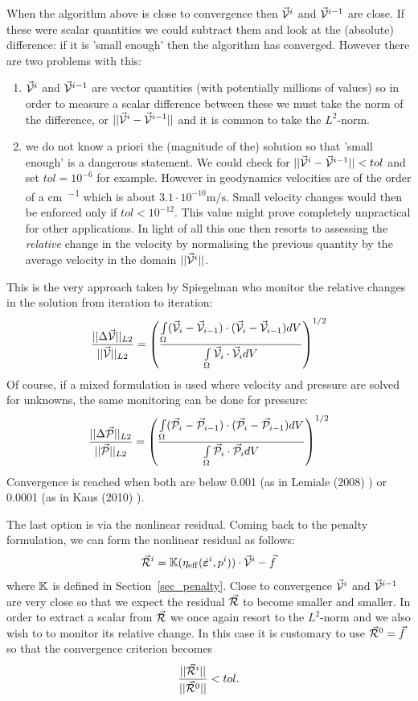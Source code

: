 When the algorithm above is close to convergence then $\vec{\cal V}^i$ and $\vec{\cal V}^{i-1}$ are close. 
If these were scalar quantities we could subtract them and look at the (absolute) difference: 
if it is 'small enough' then the algorithm has converged. 
However there are two problems with this: 
\begin{enumerate}
\item $\vec{\cal V}^i$ and $\vec{\cal V}^{i-1}$ are vector 
quantities (with potentially millions of values) so in order to measure a scalar difference 
between these we must take the norm of the difference, or $||\vec{\cal V}^i-\vec{\cal V}^{i-1}||$
and it is common to take the $L^2$-norm. 
\item we do not know a priori the (magnitude of the) solution so that 'small enough' is a dangerous 
statement. We could check for $||\vec{\cal V}^i-\vec{\cal V}^{i-1}||<tol$ and set $tol=10^{-6}$
for example. However in geodynamics velocities are of the order of a \si{\cm\per\year} which is 
about $3.1\cdot10^{-10}\si{\metre\per\second}$. Small velocity changes would then be enforced
only if $tol<10^{-12}$. This value might prove completely unpractical for other applications. 
In light of all this one then resorts to assessing the {\it relative} change in the velocity by normalising 
the previous quantity by the average velocity in the domain $||\vec{\cal V}^i||$.
\end{enumerate}

This is the very approach taken by Spiegelman \etal \cite{spmw16} who monitor the 
relative changes in the solution from iteration to iteration: 
\[
\frac{||\Delta \vec{\cal V} ||_{L2}}{||\vec{\cal V}||_{L2}} 
=
\left( \frac{\int\limits_\Omega (\vec{\cal V}_i-\vec{\cal V}_{i-1}) \cdot( \vec{\cal V}_i-\vec{\cal V}_{i-1}) dV}{\int\limits_\Omega \vec{\cal V}_i\cdot\vec{\cal V}_i dV} \right)^{1/2}
\]
Of course, if a mixed formulation is used where velocity and pressure are solved for unknowns,
the same monitoring can be done for pressure:
\[
\frac{||\Delta \vec{\cal P} ||_{L2}}{||\vec{\cal P}||_{L2}} 
=
\left( \frac{\int\limits_\Omega (\vec{\cal P}_i-\vec{\cal P}_{i-1}) \cdot( \vec{\cal P}_i-\vec{\cal P}_{i-1}) dV}{\int\limits_\Omega \vec{\cal P}_i\cdot\vec{\cal P}_i dV} \right)^{1/2}
\]
Convergence is reached when both are below 0.001 (as in Lemiale \etal (2008) \cite{lemm08}) 
or 0.0001 (as in Kaus \etal (2010) \cite{kaus10}).

The last option is via the nonlinear residual. Coming back to the penalty formulation, 
we can form the nonlinear residual as follows:
\[
\vec{\cal R}^i = {\mathbb{K}}(\eta_{\rm eff}(\dot{\bm\varepsilon}^{i},p^{i})) \cdot \vec{\cal V}^i - \vec{f}
\]
where ${\mathbb{K}}$ is defined in Section~\ref{sec_penalty}. 
Close to convergence $\vec{\cal V}^i$ and $\vec{\cal V}^{i-1}$
are very close so that we expect the residual $\vec{\cal R}$ to become smaller and smaller.
In order to extract a scalar from $\vec{\cal R}$ we once again resort to the $L^2$-norm and 
we also wish to to monitor its relative change. In this case it is customary to use $\vec{\cal R}^0=\vec{f}$ so 
that the convergence criterion becomes
\[
\frac{||\vec{\cal R}^i ||}{||\vec{\cal R}^0 ||} < tol.
\]

